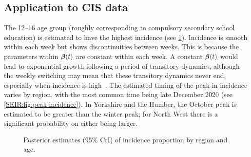 \documentclass[thesis.tex]{subfiles}
\begin{document}
\subsection{Application to CIS data} \label{SEIR:sec:application}

The 12--16 age group (roughly corresponding to compulsory secondary school education) is estimated to have the highest incidence (see \cref{SEIR:fig:incidence}).
Incidence is smooth within each week but shows discontinuities between weeks.
This is because the parameters within $\bm{\beta}(t)$ are constant within each week.
A constant $\bm{\beta}(t)$ would lead to exponential growth following a period of transitory dynamics, although the weekly switching may mean that these transitory dynamics never end, especially when incidence is high~\autocite{rhodesConvergence}.
The estimated timing of the peak in incidence varies by region, with the most common time being late December 2020 (see \cref{SEIR:fig:peak-incidence}).
In Yorkshire and the Humber, the October peak is estimated to be greater than the winter peak; for North West there is a significant probability on either being larger.
\begin{figure}
    \caption[Posterior estimates of incidence]{%
        Posterior estimates (95\% CrI) of incidence proportion by region and age.
    }
    \label{SEIR:fig:incidence}
\end{figure}
\end{document}
